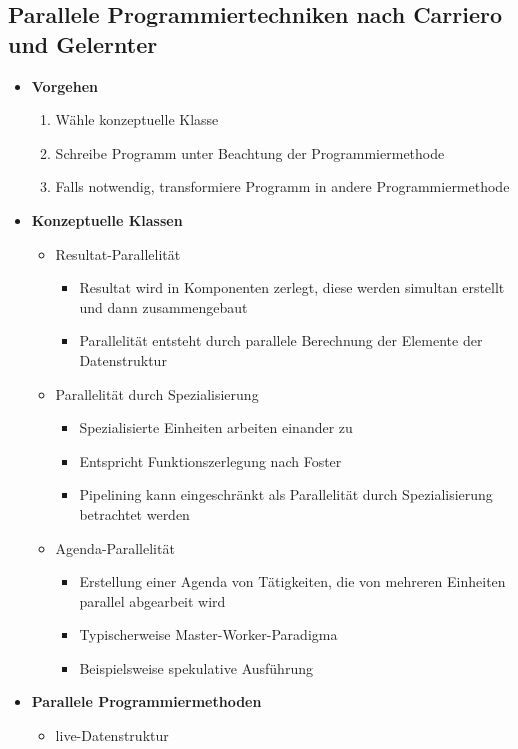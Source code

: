 \subsection{Parallele Programmiertechniken nach Carriero und Gelernter}
\begin{itemize}
	\item \textbf{Vorgehen}
	\begin{enumerate}
		\item Wähle konzeptuelle Klasse
		\item Schreibe Programm unter Beachtung der Programmiermethode
		\item Falls notwendig, transformiere Programm in andere Programmiermethode
	\end{enumerate}
	\item \textbf{Konzeptuelle Klassen}
	\begin{itemize}
		\item Resultat-Parallelität
		\begin{itemize}
			\item Resultat wird in Komponenten zerlegt, diese werden simultan erstellt und dann zusammengebaut
			\item Parallelität entsteht durch parallele Berechnung der Elemente der Datenstruktur
		\end{itemize}
		\item Parallelität durch Spezialisierung
		\begin{itemize}
			\item Spezialisierte Einheiten arbeiten einander zu
			\item Entspricht Funktionszerlegung nach Foster
			\item Pipelining kann eingeschränkt als Parallelität durch Spezialisierung betrachtet werden
		\end{itemize}
		\item Agenda-Parallelität
		\begin{itemize}
			\item Erstellung einer Agenda von Tätigkeiten, die von mehreren Einheiten parallel abgearbeit wird
			\item Typischerweise Master-Worker-Paradigma
			\item Beispielsweise spekulative Ausführung
		\end{itemize}
	\end{itemize}
	\item \textbf{Parallele Programmiermethoden}
	\begin{itemize}
		\item live-Datenstruktur

\end{itemize}
\end{itemize}

